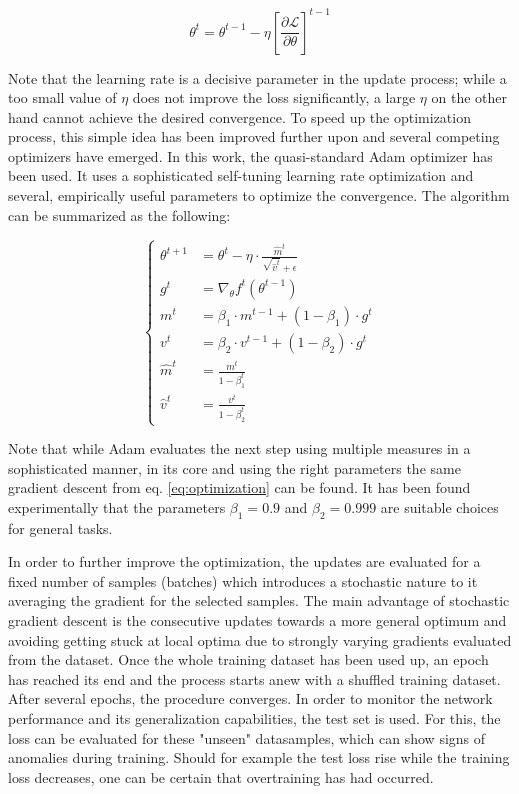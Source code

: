 \begin{equation}
	\theta^t = \theta^{t-1}-\eta\left[\frac{\partial \mathcal{L}}{\partial\theta}\right]^{t-1}
	\label{eq:optimization}
\end{equation}

Note that the learning rate is a decisive parameter in the update process; while a too small value of $\eta$ does not improve the loss significantly, a large $\eta$ on the other hand cannot achieve the desired convergence. To speed up the optimization process, this simple idea has been improved further upon and several competing optimizers have emerged. In this work, the quasi-standard Adam optimizer \cite{Adam_paper} has been used. It uses a sophisticated self-tuning learning rate optimization and several, empirically useful parameters to optimize the convergence. The algorithm can be summarized as the following:

\begin{equation*}
	\begin{cases}
			\theta^{t+1} &= \theta^t - \eta \cdot \frac{\hat{m}^t}{\sqrt{\hat{v}^t}+\epsilon}\\
			g^t &=\nabla_\theta f^t (\theta^{t-1})\\
			m^t&=\beta_1 \cdot m^{t-1} + (1-\beta_1) \cdot g^t \\
			v^t&=\beta_2 \cdot v^{t-1} + (1-\beta_2) \cdot g^t \\
			\hat{m}^t&=\frac{m^t}{1-\beta^t_1}\\
			\hat{v}^t&=\frac{v^t}{1-\beta^t_2}
	\end{cases}
\end{equation*}

Note that while Adam evaluates the next step using multiple measures in a sophisticated manner, in its core and using the right parameters the same gradient descent from eq. \ref{eq:optimization} can be found. It has been found experimentally that the parameters $\beta_1 = 0.9$ and $\beta_2 = 0.999$ are suitable choices for general tasks.

In order to further improve the optimization, the updates are evaluated for a fixed number of samples (batches) which introduces a stochastic nature to it averaging the gradient for the selected samples. The main advantage of stochastic gradient descent is the consecutive updates towards a more general optimum and avoiding getting stuck at local optima due to strongly varying gradients evaluated from the dataset.
Once the whole training dataset has been used up, an epoch has reached its end and the process starts anew with a shuffled training dataset. After several epochs, the procedure converges.
In order to monitor the network performance and its generalization capabilities, the test set is used. For this, the loss can be evaluated for these "unseen" datasamples, which can show signs of anomalies during training. Should for example the test loss rise while the training loss decreases, one can be certain that overtraining has had occurred.

